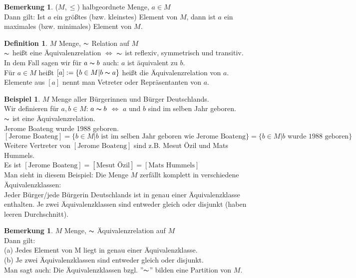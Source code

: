 \documentclass[10pt,a4paper,numbers=endperiod]{scrartcl}
\theoremstyle{definition}
\newtheorem{defi}[satz]{Definition}
\newtheorem{bem}[satz]{Bemerkung}
\newtheorem{bsp}[satz]{Beispiel}
\begin{document}
\begin{bem}
	($M, \leq$) halbgeordnete Menge, $a \in M$\\
	Dann gilt: Ist $a$ ein größtes (bzw. kleinstes) Element von $M$, dann ist $a$ ein maximales (bzw. minimales) Element von $M$.
\end{bem}

\begin{defi}
	$M$ Menge, $\thicksim$ Relation auf $M$\\
	$\thicksim$ heißt eine Äquivalenzrelation $\Leftrightarrow$ $\thicksim$ ist reflexiv, symmetrisch und transitiv.\\
	In dem Fall sagen wir für $a \thicksim b$ auch: $a$ ist äquivalent zu $b$.\\
	Für $a \in M$ heißt $[a] :=\{b \in M| b \thicksim a\}$ heißt die Äquivalenzrelation von $a$.\\
	Elemente aus $[a]$ nennt man Vetreter oder Repräsentanten von $a$.
\end{defi}

\begin{bsp}
	$M$ Menge aller Bürgerinnen und Bürger Deutschlands.\\
	Wir definieren für $a,b \in M$: $a \thicksim b$ $\Leftrightarrow$ $a$ und $b$ sind im selben Jahr geboren.\\
	$\thicksim$ ist eine Äquivalenzrelation.\\
	Jerome Boateng wurde 1988 geboren.\\
	$[\text{Jerome Boateng}] = \{b \in M| b \text{ ist im selben Jahr geboren wie Jerome Boateng}\} = \{b \in M| b \text{ wurde 1988 geboren}\}$\\
	Weitere Vertreter von $[ \text{Jerome Boateng}]$ sind z.B. Mesut Özil und Mats Hummels.\\
	Es ist $[\text{Jerome Boateng}] = [\text{Mesut Özil}] = [\text{Mats Hummels}]$\\
	Man sieht in diesem Beispiel: Die Menge $M$ zerfällt komplett in verschiedene Äquivalenzklassen:\\
	Jeder Bürger/jede Bürgerin Deutschlands ist in genau einer Äquivalenzklasse enthalten. Je zwei Äquivalenzklassen sind entweder gleich oder disjunkt (haben leeren Durchschnitt).	
\end{bsp}

\begin{bem}
	$M$ Menge, $\thicksim$ Äquivalenzrelation auf $M$\\
	Dann gilt:\\
	(a) Jedes Element von M liegt in genau einer Äquivalenzklasse.\\
	(b) Je zwei Äquivalenzklassen sind entweder gleich oder disjunkt.\\
	Man sagt auch: Die Äquivalenzklassen bzgl. ''$\thicksim$'' bilden eine Partition von $M$.
\end{bem}
\end{document}
